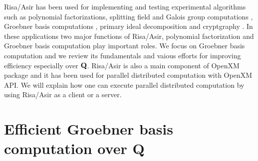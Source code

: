 \documentclass[runningheads]{cl2emult}
\def\Q{{\bf Q}}
\begin{document}
Risa/Asir has been used for implementing and testing experimental
algorithms such as polynomial factorizations, splitting field and
Galois group computations \cite{noro:ANY}, Groebner basis computations
\cite{noro:REPL,noro:NOYO}, primary ideal decomposition \cite{noro:SY}
and cryptgraphy \cite{noro:IKNY}.  In these applications two major
functions of Risa/Asir, polynomial factorization and Groebner basis
computation play important roles. We focus on Groebner basis
computation and we review its fundamentals and vaious efforts for
improving efficiency especially over $\Q$. Risa/Asir is also a main
component of OpenXM package and it has been used for parallel
distributed computation with OpenXM API.  We will explain how one can
execute parallel distributed computation by using Risa/Asir as a
client or a server.

\section{Efficient Groebner basis computation over {\bf Q}}
\label{tab:gbtech}
\end{document}
